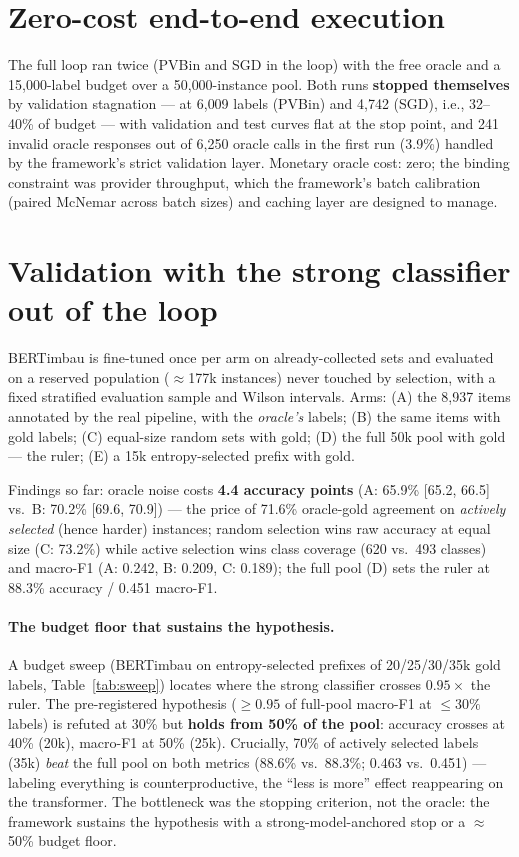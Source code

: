 \documentclass[11pt]{article}
\begin{document}
\section{Zero-cost end-to-end execution}
\label{sec:execution}

The full loop ran twice (PVBin and SGD in the loop) with the free oracle
and a 15{,}000-label budget over a 50{,}000-instance pool. Both runs
\textbf{stopped themselves} by validation stagnation --- at 6{,}009
labels (PVBin) and 4{,}742 (SGD), i.e., 32--40\% of budget --- with
validation and test curves flat at the stop point, and 241 invalid oracle
responses out of 6{,}250 oracle calls in the first run (3.9\%) handled
by the framework's strict validation layer.
Monetary oracle cost: zero; the binding constraint was provider
throughput, which the framework's batch calibration (paired McNemar
across batch sizes) and caching layer are designed to manage.

\section{Validation with the strong classifier out of the loop}
\label{sec:validation}

BERTimbau \citep{Souza2020BERTimbau} is fine-tuned once per arm on
already-collected sets and evaluated on a reserved population
($\approx$177k instances) never touched by selection, with a fixed
stratified evaluation sample and Wilson intervals. Arms: (A) the 8{,}937
items annotated by the real pipeline, with the \emph{oracle's} labels;
(B) the same items with gold labels; (C) equal-size random sets with
gold; (D) the full 50k pool with gold --- the ruler; (E) a 15k
entropy-selected prefix with gold.

Findings so far: oracle noise costs \textbf{4.4 accuracy points}
(A: 65.9\% [65.2, 66.5] vs.\ B: 70.2\% [69.6, 70.9]) --- the price of
71.6\% oracle-gold agreement on \emph{actively selected} (hence harder)
instances; random selection wins raw accuracy at equal size (C: 73.2\%)
while active selection wins class coverage (620 vs.\ 493 classes) and
macro-F1 (A: 0.242, B: 0.209, C: 0.189); the full pool (D) sets the ruler
at 88.3\% accuracy / 0.451 macro-F1.

\paragraph{The budget floor that sustains the hypothesis.} A budget sweep
(BERTimbau on entropy-selected prefixes of 20/25/30/35k gold labels,
Table~\ref{tab:sweep}) locates where the strong classifier crosses
$0.95\times$ the ruler. The pre-registered hypothesis ($\ge 0.95$ of
full-pool macro-F1 at $\le 30\%$ labels) is refuted at 30\% but
\textbf{holds from 50\% of the pool}: accuracy crosses at 40\% (20k),
macro-F1 at 50\% (25k). Crucially, 70\% of actively selected labels (35k)
\emph{beat} the full pool on both metrics (88.6\% vs.\ 88.3\%; 0.463 vs.\
0.451) --- labeling everything is counterproductive, the ``less is more''
effect reappearing on the transformer. The bottleneck was the stopping
criterion, not the oracle: the framework sustains the hypothesis with a
strong-model-anchored stop or a $\approx$50\% budget floor.
\end{document}
